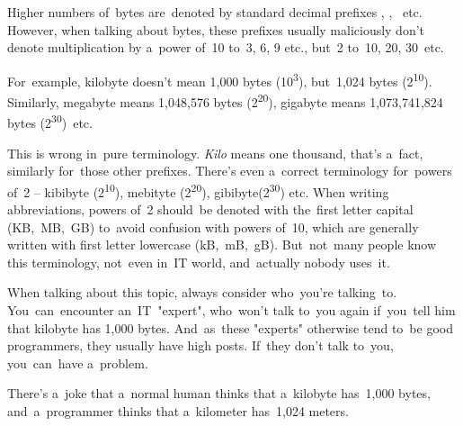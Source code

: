 \warningnonl Higher numbers of~bytes are~denoted by standard decimal prefixes , , ~etc.
However, when talking about bytes, these prefixes usually maliciously don't denote multiplication by a~power of~10 to~3, 6, 9 etc., but~2 to~10, 20, 30~etc.

For~example, kilobyte doesn't mean 1,000 bytes (10\textsuperscript{3}), but~1,024 bytes (2\textsuperscript{10}).
Similarly, megabyte means 1,048,576 bytes (2\textsuperscript{20}), gigabyte means 1,073,741,824 bytes (2\textsuperscript{30})~etc.

This is wrong in~pure terminology.
\textit{Kilo} means one thousand, that's a~fact, similarly for~those other prefixes.
There's even a~correct terminology for~powers of~2 -- kibibyte (2\textsuperscript{10}), mebityte (2\textsuperscript{20}), gibibyte(2\textsuperscript{30}) etc.
When writing abbreviations, powers of~2 should~be denoted with the~first letter capital (KB,~MB,~GB) to~avoid confusion with powers of~10, which are generally written with first letter lowercase (kB,~mB,~gB).
But~not~many people know this terminology, not~even in~IT world, and~actually nobody uses~it.

When talking about this topic, always consider who~you're talking~to.
You~can~encounter an~IT~"expert", who~won't talk to~you again if~you~tell him that kilobyte has 1,000 bytes.
And~as~these "experts" otherwise tend to~be good programmers, they usually have high posts.
If~they don't talk to~you, you~can~have a~problem.

There's a~joke that a~normal human thinks that a~kilobyte has~1,000 bytes, and~a~programmer thinks that a~kilometer has~1,024 meters.

